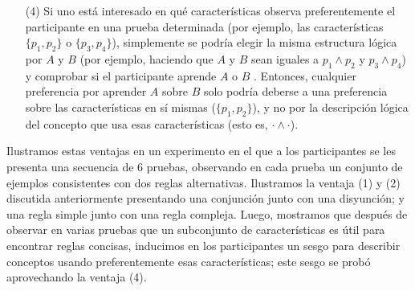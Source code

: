 \begin{enumerate}
\item [(4)] 
Si uno está interesado en qué características observa preferentemente el participante en una prueba determinada (por ejemplo, las características $\{p_1, p_2 \}$ o $\{p_3, p_4 \} $), simplemente se podría elegir la misma estructura lógica por $A$ y $B$ (por ejemplo, haciendo que $A$ y $B$ sean iguales a $p_1 \land p_2$ y $p_3 \land p_4 $) y comprobar si el participante aprende $A$ o $B$ . Entonces, cualquier preferencia por aprender $A$ sobre $B$ solo podría deberse a una preferencia sobre las características en sí mismas ($\{p_1, p_2 \} $), y no por la descripción lógica del concepto que usa esas características (esto es, $\boldsymbol{\cdot} \land \boldsymbol{\cdot}$).
\end{enumerate}



Ilustramos estas ventajas en un experimento en el que a los participantes se les presenta una secuencia de 6 pruebas, observando en cada prueba un conjunto de ejemplos consistentes con dos reglas alternativas. Ilustramos la ventaja (1) y (2) discutida anteriormente presentando una conjunción junto con una disyunción; y una regla simple junto con una regla compleja. Luego, mostramos que después de observar en varias pruebas que un subconjunto de características es útil para encontrar reglas concisas, inducimos en los participantes un sesgo para describir conceptos usando preferentemente esas características; este sesgo se probó aprovechando la ventaja (4).






